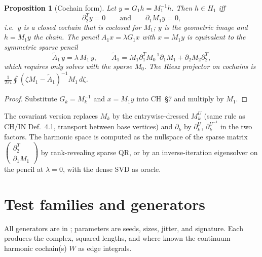 \documentclass[11pt]{article}
\theoremstyle{definition}
\theoremstyle{plain}
\newtheorem{proposition}{Proposition}[section]
\theoremstyle{remark}
\newcommand{\bd}{\partial}
\newcommand{\Tr}{^{T}}
\newcommand{\code}[1]{\path{#1}}
\begin{document}
\begin{proposition}[Cochain form]\label{prop:cochain}
Let \(y=G_1h=M_1^{-1}h\). Then \(h\in H_1\) iff
\[
\bd_2\Tr y=0\qquad\text{and}\qquad \bd_1M_1y=0 ,
\]
i.e.\ \(y\) is a closed cochain that is coclosed for \(M_1\); \(y\) is the geometric image and \(h=M_1y\) the chain. The pencil \(A_1x=\lambda G_1x\) with \(x=M_1y\) is equivalent to the symmetric sparse pencil
\[
\widetilde A_1\,y=\lambda\,M_1\,y,\qquad
\widetilde A_1=M_1\bd_1\Tr M_0^{-1}\bd_1M_1+\bd_2M_2\bd_2\Tr ,
\]
which requires only solves with the sparse \(M_0\). The Riesz projector on cochains is \(\frac{1}{2\pi i}\oint(\zeta M_1-\widetilde A_1)^{-1}M_1\,d\zeta\).
\end{proposition}
\begin{proof}
Substitute \(G_k=M_k^{-1}\) and \(x=M_1y\) into CH~\S7 and multiply by \(M_1\).
\end{proof}
The covariant version replaces \(M_k\) by the entrywise-dressed \(M_k^{U}\) (same rule as CH/IN Def.~4.1, transport between base vertices) and \(\bd_k\) by \(\bd_k^{U}\), \(\bd_k^{U^{-1}}\) in the two factors. The harmonic space is computed as the nullspace of the sparse matrix \(\begin{pmatrix}\bd_2\Tr\\ \bd_1M_1\end{pmatrix}\) by rank-revealing sparse QR, or by an inverse-iteration eigensolver on the pencil at \(\lambda=0\), with the dense SVD as oracle.

\section{Test families and generators}\label{sec:gen}

All generators are in \code{scaling_addendum.py}; parameters are seeds, sizes, jitter, and signature. Each produces the complex, squared lengths, and where known the continuum harmonic cochain(s) \(W\) as edge integrals.
\end{document}
